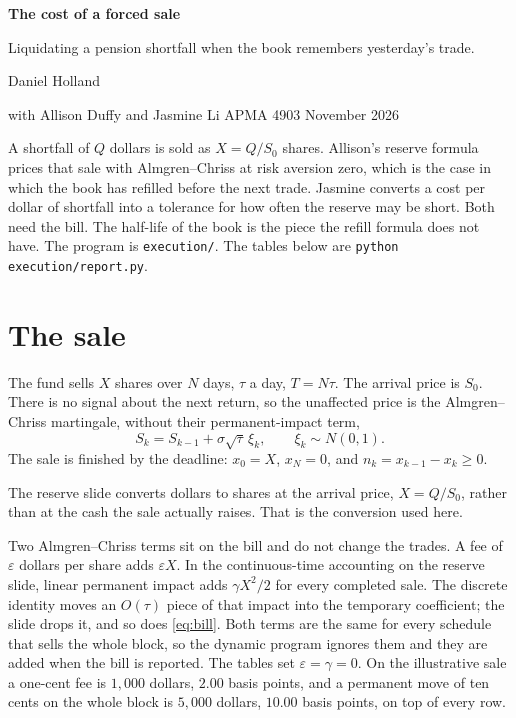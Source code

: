 \documentclass[11pt]{article}
\begin{document}
\thispagestyle{plain}

{\LARGE\bfseries\color{navy}The cost of a forced sale}\par\vspace{0.35em}
{\large\color{navy!80!black}Liquidating a pension shortfall when the book remembers yesterday's trade.}\par\vspace{0.7em}
Daniel Holland\par
{\small\color{muted}with Allison Duffy and Jasmine Li \quad APMA 4903  November 2026}\par\vspace{0.8em}

A shortfall of \(Q\) dollars is sold as \(X = Q/S_0\) shares. Allison's reserve formula prices that sale with Almgren--Chriss at risk aversion zero, which is the case in which the book has refilled before the next trade. Jasmine converts a cost per dollar of shortfall into a tolerance for how often the reserve may be short. Both need the bill. The half-life of the book is the piece the refill formula does not have. The program is \texttt{execution/}. The tables below are \texttt{python execution/report.py}.

\section{The sale}

The fund sells \(X\) shares over \(N\) days, \(\tau\) a day, \(T = N\tau\). The arrival price is \(S_0\). There is no signal about the next return, so the unaffected price is the Almgren--Chriss martingale, without their permanent-impact term,
\begin{equation}
\label{eq:price}
S_k = S_{k-1} + \sigma\sqrt{\tau}\,\xi_k, \qquad \xi_k \sim N(0,1).
\end{equation}
The sale is finished by the deadline: \(x_0 = X\), \(x_N = 0\), and \(n_k = x_{k-1} - x_k \geq 0\).

The reserve slide converts dollars to shares at the arrival price, \(X = Q/S_0\), rather than at the cash the sale actually raises. That is the conversion used here.

Two Almgren--Chriss terms sit on the bill and do not change the trades. A fee of \(\varepsilon\) dollars per share adds \(\varepsilon X\). In the continuous-time accounting on the reserve slide, linear permanent impact adds \(\gamma X^{2}/2\) for every completed sale. The discrete identity moves an \(O(\tau)\) piece of that impact into the temporary coefficient; the slide drops it, and so does \eqref{eq:bill}. Both terms are the same for every schedule that sells the whole block, so the dynamic program ignores them and they are added when the bill is reported. The tables set \(\varepsilon = \gamma = 0\). On the illustrative sale a one-cent fee is \(1{,}000\) dollars, \(2.00\) basis points, and a permanent move of ten cents on the whole block is \(5{,}000\) dollars, \(10.00\) basis points, on top of every row.
\end{document}
